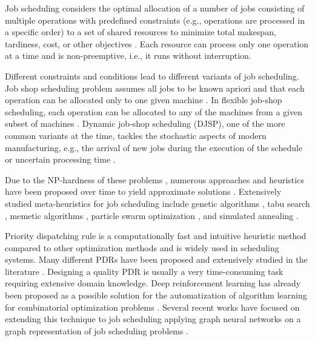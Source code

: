 

Job scheduling considers the optimal allocation of a number of jobs consisting of multiple operations with predefined constraints (e.g., operations are processed in a 
specific order) to a set of shared resources to minimize total makespan, tardiness, cost, or other objectives \cite{YamadaNakanoJSSP}. Each resource can process only one operation at a time and is non-preemptive, i.e., it runs without interruption.
\par
Different constraints and conditions lead to different variants of job scheduling. 
Job shop scheduling problem assumes all jobs to be known apriori and that each operation can be allocated only to one given machine \cite{YamadaNakanoJSSP}. In flexible job-shop scheduling, each operation can be allocated to any of the machines from a given subset of machines \cite{DAUZEREPERES2024409}. Dynamic job-shop scheduling (DJSP), one of the more common variants at the time, tackles the stochastic aspects of modern manufacturing, e.g., the arrival of new jobs during the execution of the schedule or uncertain processing time \cite{MOHAN201934}.
\par
Due to the NP-hardness of these problems \cite{Garey1976TheCO}, numerous approaches and heuristics have been proposed over time to yield approximate solutions \cite{Jansen2000ApproximationAF}. Extensively studied meta-heuristics for job scheduling include genetic algorithms \cite{PEZZELLA20083202, zhang2011effective}, tabu search \cite{Brandimarte_1993}, memetic algorithms \cite{frutos2010memetic}, particle swarm optimization \cite{ZHANG20091309}, and simulated annealing \cite{Yamada1996}.
\par
Priority dispatching rule \cite{Haupt1989ASO} is a computationally fast and intuitive heuristic method compared to other optimization methods and is widely used in scheduling systems. Many different PDRs have been proposed and extensively studied in the literature \cite{doi:10.1080/00207543.2011.611539}. Designing a quality PDR is usually a very time-consuming task requiring extensive domain knowledge. Deep reinforcement learning has already been proposed as a possible solution for the automatization of algorithm learning for combinatorial optimization problems \cite{bengio2020machine}. Several recent works have focused on extending this technique to job scheduling \cite{zhang2020learning, https://doi.org/10.1002/tee.23788, DBLP:journals/corr/abs-2106-01086, 10114974, 9826438, 10226873} applying graph neural networks on a graph representation of job scheduling problems \cite{BLAZEWICZ2000317}.\\

